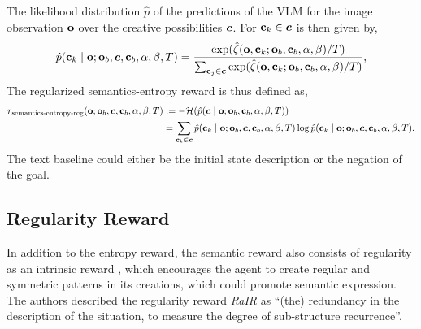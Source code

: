 The likelihood distribution \(\hat{p}\) of the predictions of the VLM for the image observation \(\mathbf{o}\) over the creative possibilities \(\bm{c}\). For \(\mathbf{c}_k \in \bm{c}\) is then given by,
\begin{equation}
    \label{eq:clip-dist-reg}
    \hat{p}(\mathbf{c}_k \mid \mathbf{o}; \mathbf{o}_b, \bm{c}, \mathbf{c}_b, \alpha, \beta, T) = \dfrac{\exp(\hat{\zeta}(\mathbf{o}, \mathbf{c}_k; \mathbf{o}_b, \mathbf{c}_b, \alpha, \beta)/T)}{\sum_{\mathbf{c}_j \in \bm{c}} \exp(\hat{\zeta}(\mathbf{o}, \mathbf{c}_k; \mathbf{o}_b, \mathbf{c}_b, \alpha, \beta)/T)},
\end{equation}
The regularized semantics-entropy reward is thus defined as,
\begin{align}
    r_{\text{semantics-entropy-reg}}(\mathbf{o}; \mathbf{o}_b, \bm{c}, \mathbf{c}_b, \alpha, \beta, T)
    &:= -\mathcal{H}(\hat{p}(\bm{c} \mid \mathbf{o}; \mathbf{o}_b, \mathbf{c}_b, \alpha, \beta, T)) \label{eq:entropy-reward-reg}\\
    &= \sum_{\mathbf{c}_k \in \bm{c}} \hat{p}(\mathbf{c}_k \mid \mathbf{o}; \mathbf{o}_b, \bm{c}, \mathbf{c}_b, \alpha, \beta, T) \log \hat{p}(\mathbf{c}_k \mid \mathbf{o}; \mathbf{o}_b, \bm{c}, \mathbf{c}_b, \alpha, \beta, T). \nonumber
\end{align}
The text baseline could either be the initial state description or the negation of the goal.

\newpage
\subsection{Regularity Reward}
\label{sec:regularity-reward}
In addition to the entropy reward, the semantic reward also consists of regularity as an intrinsic reward \citep{rair}, which encourages the agent to create regular and symmetric patterns in its creations, which could promote semantic expression.
The authors described the regularity reward \emph{RaIR} as ``(the) redundancy in the description of the situation, to measure the degree of sub-structure recurrence''.

